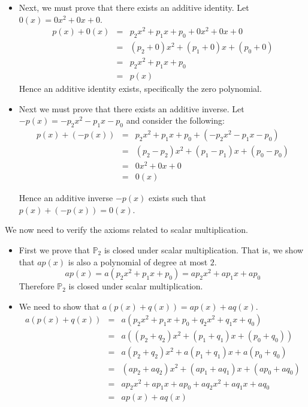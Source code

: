 \begin{solution}
\begin{itemize}
\item
Next, we must prove that there exists an additive identity. Let $0(x)=0x^2+0x+0$. 
\begin{eqnarray*}
p(x) + 0(x)  &=&  p_2x^2 + p_1x + p_0 + 0x^2 + 0x + 0 \\
&=&  (p_2 + 0)x^2  + (p_1 + 0)x + (p_0 + 0)\\
&=&  p_2x^2 + p_1x + p_0 \\
&=& p(x)
\end{eqnarray*}
Hence an additive identity exists, specifically the zero polynomial. 

\item 
Next we must prove that there exists an additive inverse. Let $-p(x) = -p_2x^2 - p_1x - p_0$ and consider the following:
\begin{eqnarray*}
p(x) + (-p(x)) &=&   p_2x^2 + p_1x + p_0 + \left( - p_2x^2  - p_1x - p_0\right) \\
&=& (p_2 - p_2)x^2  + (p_1 - p_1)x + (p_0 - p_0) \\
&=& 0x^2 + 0x + 0 \\
&=& 0(x)
\end{eqnarray*}

Hence an additive inverse $-p(x)$ exists such that $p(x) + (-p(x)) = 0(x)$. 
\end{itemize} 

We now need to verify the axioms related to scalar multiplication. 
\begin{itemize}
\item
First we prove that $\mathbb{P}_2$ is closed under scalar multiplication. That is, we show that $ap(x)$ is also a polynomial of degree at most $2$. 
\[
ap(x) = a\left(  p_2x^2 + p_1x + p_0 \right) = ap_2x^2 +ap_1x+ ap_0
\]
Therefore $\mathbb{P}_2$ is closed under scalar multiplication. 

\item
We need to show that $a(p(x) + q(x)) = ap(x) + aq(x)$. 
\begin{eqnarray*}
a(p(x) + q(x)) &=& a \left( p_2x^2 + p_1x + p_0 + q_2x^2 + q_1x + q_0 \right)\\
&=& a \left(  (p_2+q_2)x^2 + (p_1+q_1)x + (p_0+q_0)  \right)\\
&=&  a(p_2+q_2)x^2  + a(p_1+q_1)x +  a(p_0 + q_0) \\
&=& (ap_2 + aq_2)x^2 + (ap_1+aq_1)x + (ap_0 + aq_0)  \\
&=&  ap_2x^2 + ap_1x + ap_0 + aq_2x^2 +aq_1x + aq_0\\
&=& ap(x) + aq(x) 
\end{eqnarray*}


\end{itemize}
\end{solution}
